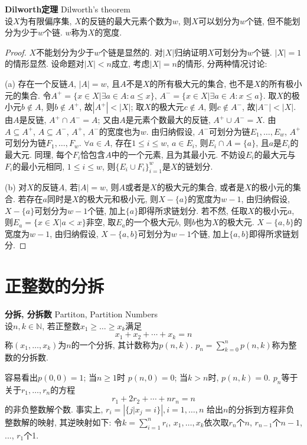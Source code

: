 \begin{thm} \textbf{Dilworth定理} Dilworth's theorem\\
设$X$为有限偏序集, $X$的反链的最大元素个数为$w$, 则$X$可以划分为$w$个链, 但不能划分为少于$w$个链. $w$称为$X$的宽度. 
\end{thm}
\begin{proof}
$X$不能划分为少于$w$个链是显然的. 对$|X|$归纳证明$X$可划分为$w$个链. $|X|=1$的情形显然. 设命题对$|X|<n$成立, 考虑$|X|=n$的情形, 分两种情况讨论:
\par (a) 存在一个反链$A$, $|A|=w$, 且$A$不是$X$的所有极大元的集合, 也不是$X$的所有极小元的集合. 令$A^+=\{x\in X\vert \exists a\in A: a\le x\}$, $A^-=\{x\in X\vert \exists a\in A: x\le a\}$. 取$X$的极小元$b\notin A$, 则$b\notin A^+$, 故$|A^+| < |X|$; 取$X$的极大元$c\notin A$, 则$c\notin A^-$, 故$|A^-|< |X|$. 由$A$是反链, $A^+\cap A^- = A$; 又由$A$是元素个数最大的反链, $A^+\cup A^- = X$. 由$A\subseteq A^+$, $A\subseteq A^-$, $A^+$, $A^-$的宽度也为$w$. 由归纳假设, $A^-$可划分为链$E_1,\dots, E_w$, $A^+$可划分为链$F_1,\dots, F_w$. $\forall a\in A$, 存在$1\le i \le w$, $a\in E_i$, 则$E_i\cap A=\{a\}$, 且$a$是$E_i$的最大元. 同理, 每个$F_i$恰包含$A$中的一个元素, 且为其最小元. 不妨设$E_i$的最大元与$F_i$的最小元相同, $1\le i\le w$, 则$\{E_i\cup F_i\}_{i=1}^{w}$是$X$的链划分. 
\par (b) 对$X$的反链$A$, 若$|A|=w$, 则$A$或者是$X$的极大元的集合, 或者是$X$的极小元的集合. 若存在$a$同时是$X$的极大元和极小元, 则$X-\{a\}$的宽度为$w-1$, 由归纳假设, $X-\{a\}$可划分为$w-1$个链, 加上$\{a\}$即得所求链划分. 若不然, 任取$X$的极小元$a$, 则$E_a=\{x\in X\vert a<x\}$非空, 取$E_a$的一个极大元$b$, 则$b$也为$X$的极大元. $X-\{a,b\}$的宽度为$w-1$, 由归纳假设, $X-\{a,b\}$可划分为$w-1$个链, 加上$\{a,b\}$即得所求链划分.
\end{proof}

\section{正整数的分拆}

\begin{dfn} \textbf{分拆, 分拆数} Partiton, Partition Numbers\\
设$n,k\in\mathbb{N}$, 若正整数$x_1\ge \dots\ge  x_k$满足
\begin{equation}
    x_1+x_2+\cdots+x_k = n
\end{equation}
称$(x_1,\dots,x_k)$为$n$的一个分拆, 其计数称为$p(n,k)$. $p_n=\sum_{k=0}^n p(n,k)$称为整数的分拆数. 
\end{dfn}
容易看出$p(0,0)=1$; 当$n\ge 1$时 $p(n,0)=0$; 当$k>n$时, $p(n,k)=0$. $p_n$等于关于$r_1,\dots,r_n$的方程
\begin{equation}
    r_1+2r_2+\cdots+nr_n = n
    \label{eq:integer_partition}
\end{equation}
的非负整数解个数. 事实上, $r_i=|\{j\vert x_j=i\}|, i=1,\dots,n$ 给出$n$的分拆到方程非负整数解的映射, 其逆映射如下: 令$k=\sum_{i=1}^n r_i$, $x_1,\dots, x_{k}$依次取$r_n$个$n$, $r_{n-1}$个$n-1$, ..., $r_1$个1. 

